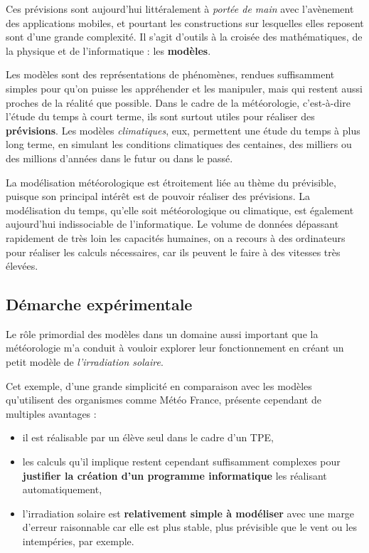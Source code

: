 \documentclass[12pt]{article}
\begin{document}
Ces prévisions sont aujourd'hui littéralement à \emph{portée de main} avec l'avènement des applications mobiles, et pourtant les constructions sur lesquelles elles reposent sont d'une grande complexité.
Il s'agit d'outils à la croisée des mathématiques, de la physique et de l'informatique : les \textbf{modèles}.

Les modèles sont des représentations de phénomènes, rendues suffisamment simples pour qu'on puisse les appréhender et les manipuler, mais qui restent aussi proches de la réalité que possible.
Dans le cadre de la météorologie, c'est-à-dire l'étude du temps à court terme, ils sont surtout utiles pour réaliser des \textbf{prévisions}.
Les modèles \emph{climatiques}, eux, permettent une étude du temps à plus long terme, en simulant les conditions climatiques des centaines, des milliers ou des millions d'années dans le futur ou dans le passé.

La modélisation météorologique est étroitement liée au thème du prévisible, puisque son principal intérêt est de pouvoir réaliser des prévisions.
La modélisation du temps, qu'elle soit météorologique ou climatique, est également aujourd'hui indissociable de l'informatique.
Le volume de données dépassant rapidement de très loin les capacités humaines, on a recours à des ordinateurs pour réaliser les calculs nécessaires, car ils peuvent le faire à des vitesses très élevées.


\subsection{Démarche expérimentale}

Le rôle primordial des modèles dans un domaine aussi important que la météorologie m'a conduit à vouloir explorer leur fonctionnement en créant un petit modèle de \emph{l'irradiation solaire}.

Cet exemple, d'une grande simplicité en comparaison avec les modèles qu'utilisent des organismes comme Météo France, présente cependant de multiples avantages :

\begin{itemize}
  \item il est réalisable par un élève seul dans le cadre d'un TPE,
  \item les calculs qu'il implique restent cependant suffisamment complexes pour \textbf{justifier la création d'un programme informatique} les réalisant automatiquement,
  \item l'irradiation solaire est \textbf{relativement simple à modéliser} avec une marge d'erreur raisonnable car elle est plus stable, plus prévisible que le vent ou les intempéries, par exemple.
\end{itemize}
\end{document}

